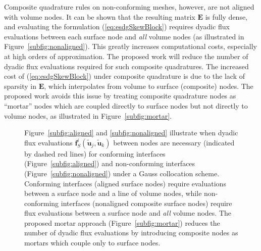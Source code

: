 \documentclass[review]{siamart0216}
\renewcommand{\tilde}{\widetilde}
\newcommand{\LRp}[1]{\left( #1 \right)}
\begin{document}
Composite quadrature rules on non-conforming meshes, however, are not aligned with volume nodes.  It can be shown that the resulting matrix $\bm{E}$ is fully dense, and evaluating the formulation (\ref{eq:esdgSkewBlock}) requires dyadic flux evaluations between each surface node and \textit{all} volume nodes (as illustrated in Figure~\ref{subfig:nonaligned}).  This greatly increases computational costs, especially at high orders of approximation.  The proposed work will reduce the number of dyadic flux evaluations required for such composite quadratures.  The increased cost of (\ref{eq:esdgSkewBlock}) under composite quadrature is due to the lack of sparsity in $\bm{E}$, which interpolates from volume to surface (composite) nodes.  The proposed work avoids this issue by treating composite quadrature nodes as ``mortar'' nodes which are coupled directly to surface nodes but not directly to volume nodes, as illustrated in Figure~\ref{subfig:mortar}.

\begin{figure}
\centering
{}
\hspace{4em}
\caption{Figure~\ref{subfig:aligned} and \ref{subfig:nonaligned} illustrate when dyadic flux evaluations $\bm{f}^i_S\LRp{\tilde{\bm{u}}_j,\tilde{\bm{u}}_k}$ between nodes are necessary (indicated by dashed red lines) for conforming interfaces (Figure~\ref{subfig:aligned}) and non-conforming interfaces (Figure~\ref{subfig:nonaligned}) under a Gauss collocation scheme.  Conforming interfaces (aligned surface nodes) require evaluations between a surface node and a line of volume nodes, while non-conforming interfaces (nonaligned composite surface nodes) require flux evaluations between a surface node and \textit{all} volume nodes.  The proposed mortar approach (Figure~\ref{subfig:mortar}) reduces the number of dyadic flux evaluations by introducing composite nodes as mortars which couple only to surface nodes. }
\label{fig:fluxsparsity}
\end{figure}
\end{document}
